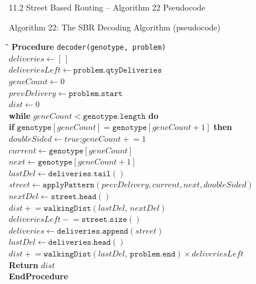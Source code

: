 \documentclass[aspectratio=169,10pt]{beamer}
\begin{document}
\begin{frame}[allowframebreaks]{11.2 Street Based Routing -- Algorithm 22 Pseudocode}

  \begin{block}{Algorithm 22: The SBR Decoding Algorithm (pseudocode)}
    \begin{footnotesize}
    \begin{tabbing}
      \hspace{2em}\=\hspace{2em}\=\hspace{2em}\=\kill
      \textbf{Procedure} \texttt{decoder(genotype, problem)} \\
      \> $deliveries \leftarrow [\,]$ \\
      \> $deliveriesLeft \leftarrow \mathtt{problem.qtyDeliveries}$ \\
      \> $geneCount \leftarrow 0$ \\
      \> $prevDelivery \leftarrow \mathtt{problem.start}$ \\
      \> $dist \leftarrow 0$ \\
      \> \textbf{while} $geneCount < \mathtt{genotype.length}$ \textbf{do} \\
      \>\> \textbf{if} $\mathtt{genotype}[geneCount] = \mathtt{genotype}[geneCount+1]$ \textbf{then} \\
      \>\>\> $doubleSided \leftarrow \mathit{true}$;\quad $geneCount \mathrel{+}= 1$ \\
      \>\> $current \leftarrow \mathtt{genotype}[geneCount]$ \\
      \>\> $next \leftarrow \mathtt{genotype}[geneCount+1]$ \\
      \>\> $lastDel \leftarrow \mathtt{deliveries.tail()}$ \\
      \>\> $street \leftarrow \mathtt{applyPattern}(prevDelivery, current, next, doubleSided)$ \\
      \>\> $nextDel \leftarrow \mathtt{street.head()}$ \\
      \>\> $dist \mathrel{+}= \mathtt{walkingDist}(lastDel,\, nextDel)$ \\
      \>\> $deliveriesLeft \mathrel{-}= \mathtt{street.size()}$ \\
      \>\> $deliveries \leftarrow \mathtt{deliveries.append}(street)$ \\
      \> $lastDel \leftarrow \mathtt{deliveries.head()}$ \\
      \> $dist \mathrel{+}= \mathtt{walkingDist}(lastDel,\, \mathtt{problem.end}) \times deliveriesLeft$ \\
      \> \textbf{Return} $dist$ \\
      \textbf{EndProcedure}
    \end{tabbing}
    \end{footnotesize}
  \end{block}


\end{frame}
\end{document}
